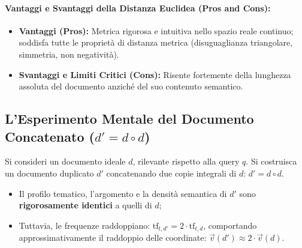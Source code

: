 \paragraph{Vantaggi e Svantaggi della Distanza Euclidea (Pros and Cons):}
\begin{itemize}
    \item \textbf{Vantaggi (Pros):} Metrica rigorosa e intuitiva nello spazio reale continuo; soddisfa tutte le propriet\`a di distanza metrica (disuguaglianza triangolare, simmetria, non negativit\`a).
    \item \textbf{Svantaggi e Limiti Critici (Cons):} Risente fortemente della lunghezza assoluta del documento anzich\'e del suo contenuto semantico.
\end{itemize}

\FloatBarrier
\subsection{L'Esperimento Mentale del Documento Concatenato ($d' = d \circ d$)}
\label{subsec:esperimento-documento-concatenato}

Si consideri un documento ideale $d$, rilevante rispetto alla query $q$. Si costruisca un documento duplicato $d'$ concatenando due copie integrali di $d$: $d' = d \circ d$.
\begin{itemize}
    \item Il profilo tematico, l'argomento e la densit\`a semantica di $d'$ sono \textbf{rigorosamente identici} a quelli di $d$;
    \item Tuttavia, le frequenze raddoppiano: $\text{tf}_{t, d'} = 2 \cdot \text{tf}_{t, d}$, comportando approssimativamente il raddoppio delle coordinate: $\vec{v}(d') \approx 2 \cdot \vec{v}(d)$.
\end{itemize}

